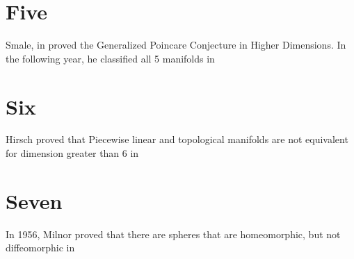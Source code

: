 \section{Five}
Smale, in \cite{smale_1960} proved the Generalized Poincare Conjecture in Higher Dimensions.
In the following year, he classified all 5 manifolds in \cite{smale_1962}

\section{Six}
Hirsch proved that Piecewise linear and topological manifolds are not equivalent for dimension greater than 6 in \cite{hirsch_1975}

\section{Seven}
In 1956, Milnor proved that there are spheres that are homeomorphic, but not diffeomorphic in \cite{milnor_1956}
